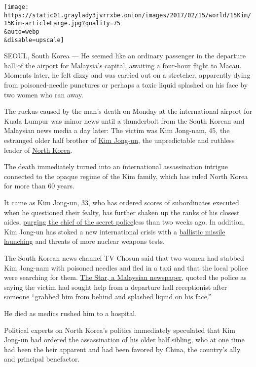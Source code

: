 \texttt{[image: https://static01.graylady3jvrrxbe.onion/images/2017/02/15/world/15Kim/15Kim-articleLarge.jpg?quality=75\\\&auto=webp\\\&disable=upscale]}

SEOUL, South Korea --- He seemed like an ordinary passenger in the
departure hall of the airport for Malaysia's capital, awaiting a
four-hour flight to Macau. Moments later, he felt dizzy and was carried
out on a stretcher, apparently dying from poisoned-needle punctures or
perhaps a toxic liquid splashed on his face by two women who ran away.

The ruckus caused by the man's death on Monday at the international
airport for Kuala Lumpur was minor news until a thunderbolt from the
South Korean and Malaysian news media a day later: The victim was Kim
Jong-nam, 45, the estranged older half brother of
\href{https://www.nytimes3xbfgragh.onion/2017/01/25/world/asia/north-korea-defector.html}{Kim
Jong-un}, the unpredictable and ruthless leader of
\href{https://www.nytimes3xbfgragh.onion/topic/destination/north-korea?8qa}{North
Korea}.

The death immediately turned into an international assassination
intrigue connected to the opaque regime of the Kim family, which has
ruled North Korea for more than 60 years.

It came as Kim Jong-un, 33, who has ordered scores of subordinates
executed when he questioned their fealty, has further shaken up the
ranks of his closest aides,
\href{https://www.nytimes3xbfgragh.onion/2017/02/03/world/asia/north-korea-purge-kim-jong-un-kim-won-hong.html?_r=0}{purging
the chief of the secret police}less than two weeks ago. In addition, Kim
Jong-un has stoked a new international crisis with a
\href{https://www.nytimes3xbfgragh.onion/2017/02/13/world/asia/north-korea-missile-launch-success.html}{ballistic
missile launching} and threats of more nuclear weapons tests.

The South Korean news channel TV Chosun said that two women had stabbed
Kim Jong-nam with poisoned needles and fled in a taxi and that the local
police were searching for them.
\href{http://www.thestar.com.my/news/nation/2017/02/14/police-confirm-kim-jong-nam-killed-at-klia/}{The
Star, a Malaysian newspaper}, quoted the police as saying the victim had
sought help from a departure hall receptionist after someone ``grabbed
him from behind and splashed liquid on his face.''

He died as medics rushed him to a hospital.

Political experts on North Korea's politics immediately speculated that
Kim Jong-un had ordered the assassination of his older half sibling, who
at one time had been the heir apparent and had been favored by China,
the country's ally and principal benefactor.

